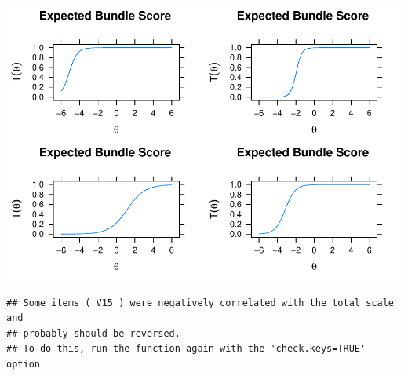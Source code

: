 \documentclass[
  english,
  man,floatsintext]{apa6}
\begin{document}
\includegraphics{ICC_project_files/figure-latex/unnamed-chunk-3-3.pdf}

\begin{verbatim}
## Some items ( V15 ) were negatively correlated with the total scale and 
## probably should be reversed.  
## To do this, run the function again with the 'check.keys=TRUE' option
\end{verbatim}
\end{document}
